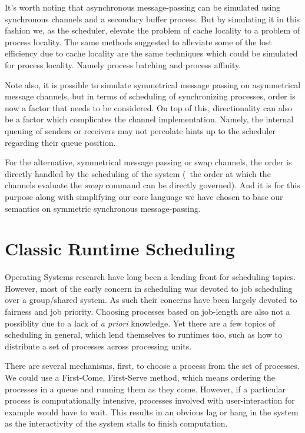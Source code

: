 It's worth noting that asynchronous message-passing can be simulated using 
synchronous channels and a secondary buffer process. But by simulating it in 
this fashion we, as the scheduler, elevate the problem of cache locality to a
problem of process locality. The same methods suggested to alleviate some of the 
lost efficiency due to cache locality \cite{markatos1991load,markatos1991memory}
are the same techniques which could be simulated for process locality. Namely
process batching and process affinity.

Note also, it is possible to simulate symmetrical message passing on asymmetrical 
message channels, but in terms of scheduling of synchronizing processes, order 
is now a factor that needs to be considered. On top of this, directionality can 
also be a factor which complicates the channel implementation. Namely, the 
internal queuing of senders or receivers may not percolate hints up to the 
scheduler regarding their queue position. 

For the alternative, symmetrical message passing or swap channels, the order is 
directly handled by the scheduling of the system (\ie~the order at which the 
channels evaluate the $swap$ command can be directly governed). And it is for 
this purpose along with simplifying our core language we have chosen to base our
semantics on symmetric synchronous message-passing. 

\section{Classic Runtime Scheduling}

Operating Systems research have long been a leading front for scheduling topics. 
However, most of the early concern in scheduling was devoted to job scheduling 
over a group/shared system. As such their concerns have been largely devoted to 
fairness and job priority. Choosing processes based on job-length are also not
a possiblity due to a lack of {\sl a priori} knowledge. Yet there are a few 
topics of scheduling in general, which lend themselves to runtimes too, such as 
how to distribute a set of processes across processing units.

There are several mechanisms, first, to choose a process from the set of 
processes. We could use a First-Come, First-Serve method, which means ordering 
the processes in a queue and running them as they come. However, if a particular
process is computationally intensive, processes involved with user-interaction 
for example would have to wait. This results in an obvious lag or hang in the 
system as the interactivity of the system stalls to finish computation. 

